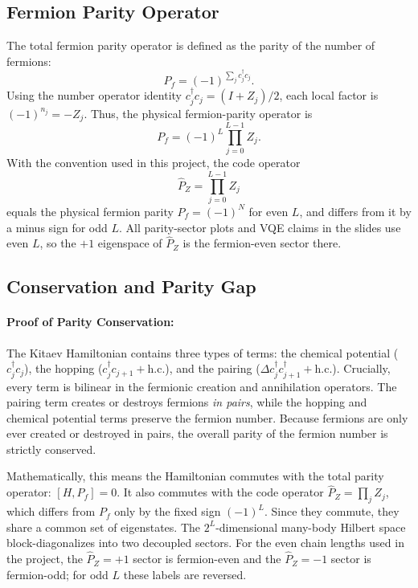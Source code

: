 \documentclass[11pt]{article}
\begin{document}
\subsection{Fermion Parity Operator}
The total fermion parity operator is defined as the parity of the number of fermions:
\begin{equation}
  P_f = (-1)^{\sum_j c_j^\dagger c_j}.
\end{equation}
Using the number operator identity $c_j^\dagger c_j = (I + Z_j)/2$, each local
factor is $(-1)^{n_j}=-Z_j$. Thus, the physical fermion-parity operator is
\begin{equation}
  P_f = (-1)^L \prod_{j=0}^{L-1} Z_j.
\end{equation}
With the convention used in this project, the code operator
\begin{equation}
  \hat{P}_Z=\prod_{j=0}^{L-1}Z_j
\end{equation}
equals the physical fermion parity $P_f=(-1)^N$ for even $L$, and differs from it
by a minus sign for odd $L$. All parity-sector plots and VQE claims in the slides
use even $L$, so the $+1$ eigenspace of $\hat{P}_Z$ is the fermion-even sector
there.

\subsection{Conservation and Parity Gap}

\paragraph{Proof of Parity Conservation:}
The Kitaev Hamiltonian contains three types of terms: the chemical potential ($c_j^\dagger c_j$), the hopping ($c_j^\dagger c_{j+1} + \text{h.c.}$), and the pairing ($\Delta c_j^\dagger c_{j+1}^\dagger + \text{h.c.}$). Crucially, every term is bilinear in the fermionic creation and annihilation operators. The pairing term creates or destroys fermions \emph{in pairs}, while the hopping and chemical potential terms preserve the fermion number. Because fermions are only ever created or destroyed in pairs, the overall parity of the fermion number is strictly conserved. 

Mathematically, this means the Hamiltonian commutes with the total parity operator:
$[H, P_f] = 0$. It also commutes with the code operator $\hat{P}_Z=\prod_j Z_j$,
which differs from $P_f$ only by the fixed sign $(-1)^L$. Since they commute, they
share a common set of eigenstates. The $2^L$-dimensional many-body Hilbert space
block-diagonalizes into two decoupled sectors. For the even chain lengths used in
the project, the $\hat{P}_Z=+1$ sector is fermion-even and the $\hat{P}_Z=-1$
sector is fermion-odd; for odd $L$ these labels are reversed.
\end{document}
